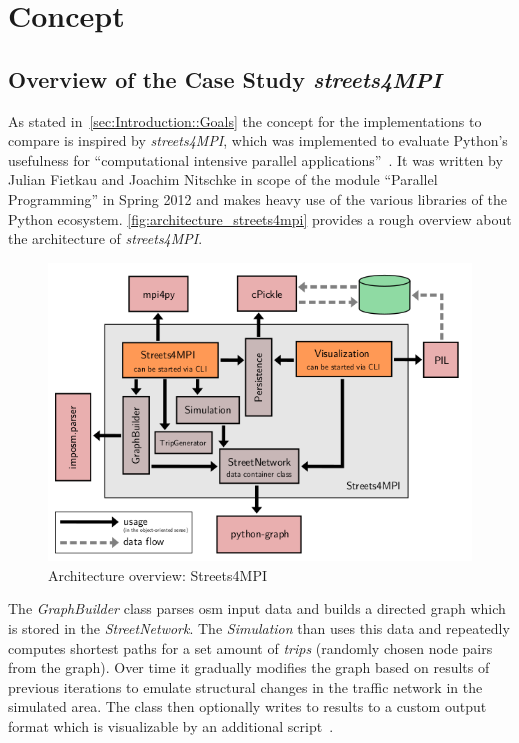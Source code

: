 \chapter{Concept}
\label{ch:Concept}


\section{Overview of the Case Study \textit{streets4MPI}}
\label{sec:Concept::Overview}

As stated in~\autoref{sec:Introduction::Goals} the concept for the implementations to compare is inspired by \textit{streets4MPI}, which was implemented to evaluate Python's usefulness for ``computational intensive parallel applications''~\cite[p.3]{streets_report}. It was written by Julian Fietkau and Joachim Nitschke in scope of the module ``Parallel Programming'' in Spring 2012 and makes heavy use of the various libraries of the Python ecosystem. \autoref{fig:architecture_streets4mpi} provides a rough overview about the architecture of \textit{streets4MPI}.

\begin{figure}[htb]
    \centering
    \includegraphics[width=.75\textwidth]{img/architecture_streets4mpi.png}
    \caption{Architecture overview: Streets4MPI~\cite[p. 9]{streets_report}}
    \label{fig:architecture_streets4mpi}
\end{figure}

The \textit{GraphBuilder} class parses \gls{osm} input data and builds a directed graph which is stored in the \textit{StreetNetwork}. The \textit{Simulation} than uses this data and repeatedly computes shortest paths for a set amount of \textit{trips} (randomly chosen node pairs from the graph). Over time it gradually modifies the graph based on results of previous iterations to emulate structural changes in the traffic network in the simulated area. The  class then optionally writes to results to a custom output format which is visualizable by an additional script~\cite{streets_report}.

